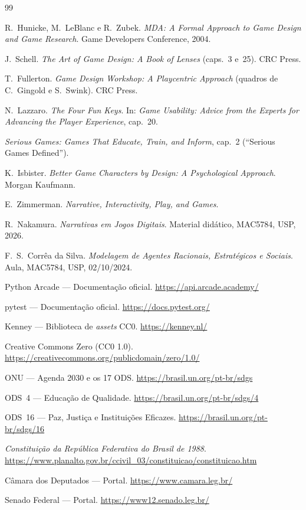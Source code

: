 \documentclass[10pt,twocolumn]{article}
\begin{document}
\balance
\begin{thebibliography}{99}
\small

 R.~Hunicke, M.~LeBlanc e R.~Zubek. \emph{MDA: A Formal Approach to
Game Design and Game Research}. Game Developers Conference, 2004.

 J.~Schell. \emph{The Art of Game Design: A Book of Lenses}
(caps.~3 e~25). CRC Press.

 T.~Fullerton. \emph{Game Design Workshop: A Playcentric
Approach} (quadros de C.~Gingold e S.~Swink). CRC Press.

 N.~Lazzaro. \emph{The Four Fun Keys}. In: \emph{Game Usability:
Advice from the Experts for Advancing the Player Experience}, cap.~20.

 \emph{Serious Games: Games That Educate, Train, and
Inform}, cap.~2 (``Serious Games Defined'').

 K.~Isbister. \emph{Better Game Characters by Design: A
Psychological Approach}. Morgan Kaufmann.

 E.~Zimmerman. \emph{Narrative, Interactivity, Play, and Games}.

 R.~Nakamura. \emph{Narrativas em Jogos Digitais}. Material
did\'atico, MAC5784, USP, 2026.

 F.~S.~Corr\^ea da Silva. \emph{Modelagem de Agentes Racionais,
Estrat\'egicos e Sociais}. Aula, MAC5784, USP, 02/10/2024.

 Python Arcade --- Documenta\c{c}\~ao oficial.
\url{https://api.arcade.academy/}

 pytest --- Documenta\c{c}\~ao oficial.
\url{https://docs.pytest.org/}

 Kenney --- Biblioteca de \emph{assets} CC0. \url{https://kenney.nl/}

 Creative Commons Zero (CC0 1.0).
\url{https://creativecommons.org/publicdomain/zero/1.0/}

 ONU --- Agenda 2030 e os 17 ODS.
\url{https://brasil.un.org/pt-br/sdgs}

 ODS~4 --- Educa\c{c}\~ao de Qualidade.
\url{https://brasil.un.org/pt-br/sdgs/4}

 ODS~16 --- Paz, Justi\c{c}a e Institui\c{c}\~oes Eficazes.
\url{https://brasil.un.org/pt-br/sdgs/16}

 \emph{Constitui\c{c}\~ao da Rep\'ublica Federativa do Brasil de
1988}. \url{https://www.planalto.gov.br/ccivil_03/constituicao/constituicao.htm}

 C\^amara dos Deputados --- Portal. \url{https://www.camara.leg.br/}

 Senado Federal --- Portal. \url{https://www12.senado.leg.br/}

\end{thebibliography}
\end{document}
